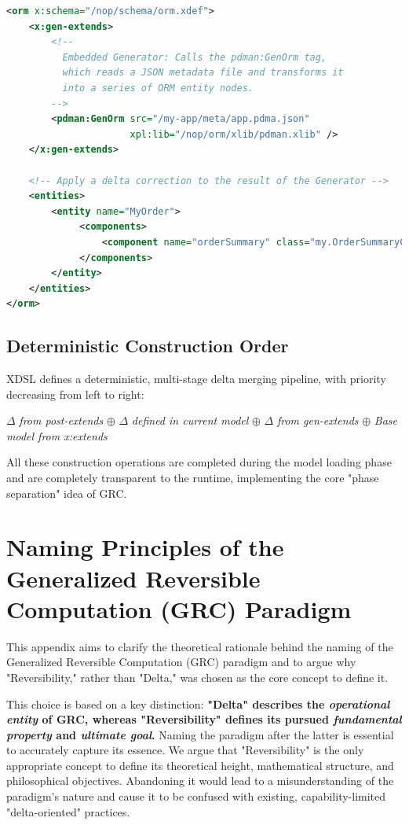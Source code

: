 \documentclass[11pt]{article}
\begin{document}
\begin{lstlisting}[language=XML, caption={Model with an embedded generator}]
<orm x:schema="/nop/schema/orm.xdef">
    <x:gen-extends>
        <!--
          Embedded Generator: Calls the pdman:GenOrm tag,
          which reads a JSON metadata file and transforms it 
          into a series of ORM entity nodes.
        -->
        <pdman:GenOrm src="/my-app/meta/app.pdma.json"
                      xpl:lib="/nop/orm/xlib/pdman.xlib" />
    </x:gen-extends>

    <!-- Apply a delta correction to the result of the Generator -->
    <entities>
        <entity name="MyOrder">
             <components>
                 <component name="orderSummary" class="my.OrderSummaryComponent"/>
             </components>
        </entity>
    </entities>
</orm>
\end{lstlisting}

\subsection{Deterministic Construction Order}

XDSL defines a deterministic, multi-stage delta merging pipeline, with priority decreasing from left to right:

\begin{center}
$\Delta$ \textit{from post-extends} $\oplus$ $\Delta$ \textit{defined in current model} $\oplus$ $\Delta$ \textit{from gen-extends} $\oplus$ \textit{Base model from x:extends}
\end{center}

All these construction operations are completed during the model loading phase and are completely transparent to the runtime, implementing the core "phase separation" idea of GRC.

\section{Naming Principles of the Generalized Reversible Computation (GRC) Paradigm}

This appendix aims to clarify the theoretical rationale behind the naming of the Generalized Reversible Computation (GRC) paradigm and to argue why "Reversibility," rather than "Delta," was chosen as the core concept to define it.

This choice is based on a key distinction: \textbf{"Delta" describes the \emph{operational entity} of GRC, whereas "Reversibility" defines its pursued \emph{fundamental property} and \emph{ultimate goal}.} Naming the paradigm after the latter is essential to accurately capture its essence. We argue that "Reversibility" is the only appropriate concept to define its theoretical height, mathematical structure, and philosophical objectives. Abandoning it would lead to a misunderstanding of the paradigm's nature and cause it to be confused with existing, capability-limited "delta-oriented" practices.
\end{document}
